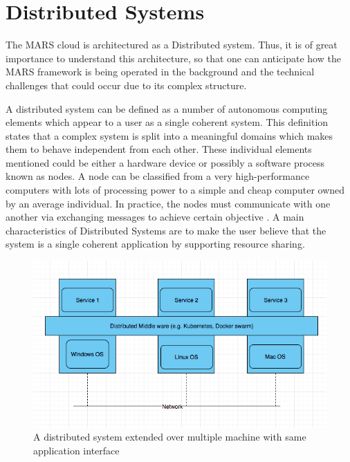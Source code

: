 \section{Distributed Systems}

    The MARS cloud is architectured as a Distributed system. Thus, it is of great importance to understand
    this architecture, so that one can anticipate how the MARS framework is being operated in the background and
    the technical challenges that could occur due to its complex structure.
    \par
    A distributed system can be defined as a number of autonomous computing elements which 
    appear to a user as a single coherent system. 
    This definition states that a complex system is split into a meaningful domains which makes them to behave independent from each other.
    These individual elements mentioned could be either a hardware device or possibly a software process known as nodes. A node can
    be classified from a very high-performance computers with lots of processing power to a simple and cheap computer owned by an average individual. 
    In practice, the nodes must communicate with one another via exchanging messages to achieve certain objective \cite[p.~2]{DistributedSystems}.
    A main characteristics of Distributed Systems are to make the user believe that the system is a single coherent application by supporting 
    resource sharing.

    \begin{figure}[htbp!]
        \centering \includegraphics[scale=0.5]{grafiken/distributedSystem.png}
        \caption{A distributed system extended over multiple machine with same application 
        interface \cite[p.~5]{DistributedSystems}}
        \label{fig:distributedSystem}
    \end{figure}

